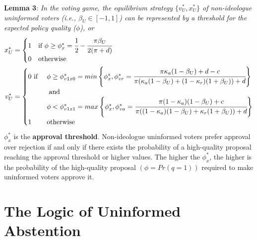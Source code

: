 \documentclass[letterpaper, 12pt]{article}
\begin{document}
    \noindent \textbf{Lemma 3}: \textit{In the voting game, the equilibrium strategy $\{v^*_U, x^*_U\}$ of non-ideologue uninformed voters (i.e., $\beta_U \in [-1, 1]$) can be represented by a threshold for the expected policy quality ($\phi$), or} 
    \begin{align}
    x^*_U &= 
    \begin{cases}
    1 & \text{if } \phi \geq \phi^*_x = \cfrac{1}{2} - \cfrac{\pi \beta_U}{2(\pi + d)}\\
    0 & \text{otherwise}
    \end{cases} \\
    v^*_U &= 
    \begin{cases}
    0 \text{ if } 
    &\phi \geq \phi^*_{v1x0} = min\left\{ \phi^*_x, \phi^*_{vr} = \cfrac{\pi \kappa_{a} (1-\beta_U) + d - c}{\pi (\kappa_{a} (1-\beta_U) + (1-\kappa_{r}) (1 + \beta_U))+ d} \right\} \\
    &\text{ and } \\ 
    &\phi < \phi^*_{v1x1} =max\left\{ \phi^*_x,  \phi^*_{va} = \cfrac{\pi (1 - \kappa_{a}) (1-\beta_U) + c}{\pi ((1-\kappa_{a}) (1-\beta_U) + \kappa_{r} (1 + \beta_U)) + d} \right\} \\
    1 &\text{otherwise}
    \end{cases} 
    \end{align}
    \noindent $\phi^*_x$ is the \textbf{approval threshold}. Non-ideologue uninformed voters prefer approval over rejection if and only if there exists the probability of a high-quality proposal reaching the approval threshold or higher values. The higher the $\phi^*_x$, the higher is the probability of the high-quality proposal $(\phi = Pr(q=1))$ required to make uninformed voters approve it. 
    
    \section*{The Logic of Uninformed Abstention}
    
\end{document}
